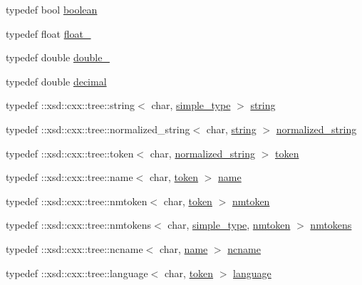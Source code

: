 \begin{DoxyCompactItemize}
\item 
typedef bool \hyperlink{namespacexml__schema_ae5ada4ec9c54b51765c3e4c0e9631bba}{boolean}
\item 
typedef float \hyperlink{namespacexml__schema_ad7e04ab17bba0b3fdde43fb79ef6ed87}{float\+\_\+}
\item 
typedef double \hyperlink{namespacexml__schema_aac2d3d3483d3a20e8d96d2e8e5b3a470}{double\+\_\+}
\item 
typedef double \hyperlink{namespacexml__schema_a69bfaf24f63a8c18ebd8e21db6b343df}{decimal}
\item 
typedef \+::xsd\+::cxx\+::tree\+::string$<$ char, \hyperlink{namespacexml__schema_a2ee8a034145ffa154d46910b41892495}{simple\+\_\+type} $>$ \hyperlink{namespacexml__schema_ac0cec83a330f0024e4e318b3deac5104}{string}
\item 
typedef \+::xsd\+::cxx\+::tree\+::normalized\+\_\+string$<$ char, \hyperlink{namespacexml__schema_ac0cec83a330f0024e4e318b3deac5104}{string} $>$ \hyperlink{namespacexml__schema_a72078e45c15d8879c64071dea056f60c}{normalized\+\_\+string}
\item 
typedef \+::xsd\+::cxx\+::tree\+::token$<$ char, \hyperlink{namespacexml__schema_a72078e45c15d8879c64071dea056f60c}{normalized\+\_\+string} $>$ \hyperlink{namespacexml__schema_aac8666db04b41e8b19afa60d8ecb1e89}{token}
\item 
typedef \+::xsd\+::cxx\+::tree\+::name$<$ char, \hyperlink{namespacexml__schema_aac8666db04b41e8b19afa60d8ecb1e89}{token} $>$ \hyperlink{namespacexml__schema_a2f1617231643eded4c3b9aa5f1ed6c08}{name}
\item 
typedef \+::xsd\+::cxx\+::tree\+::nmtoken$<$ char, \hyperlink{namespacexml__schema_aac8666db04b41e8b19afa60d8ecb1e89}{token} $>$ \hyperlink{namespacexml__schema_af60189e21a69b126898eb625992ff730}{nmtoken}
\item 
typedef \+::xsd\+::cxx\+::tree\+::nmtokens$<$ char, \hyperlink{namespacexml__schema_a2ee8a034145ffa154d46910b41892495}{simple\+\_\+type}, \hyperlink{namespacexml__schema_af60189e21a69b126898eb625992ff730}{nmtoken} $>$ \hyperlink{namespacexml__schema_ab2ece9a172d690c8276a27fa696a3b43}{nmtokens}
\item 
typedef \+::xsd\+::cxx\+::tree\+::ncname$<$ char, \hyperlink{namespacexml__schema_a2f1617231643eded4c3b9aa5f1ed6c08}{name} $>$ \hyperlink{namespacexml__schema_adb64d7469eb27804ae649fbaccba54d6}{ncname}
\item 
typedef \+::xsd\+::cxx\+::tree\+::language$<$ char, \hyperlink{namespacexml__schema_aac8666db04b41e8b19afa60d8ecb1e89}{token} $>$ \hyperlink{namespacexml__schema_a9ccaf8d8efb41ea5331f512f381fc6ce}{language}

\end{DoxyCompactItemize}
